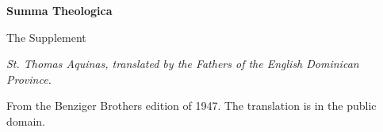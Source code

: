 \documentclass[11pt,letterpaper]{article}
\begin{document}
\color{ink}

\begin{titlepage}
\centering
\vspace*{4em}
{\LARGE\bfseries\color{heading} Summa Theologica\par}
\vspace{1.5em}
{\Large\color{subhead} The Supplement\par}
\vspace{2.5em}
{\itshape\color{subhead} St. Thomas Aquinas, translated by the Fathers of
the English Dominican Province.\par}
\vfill
{\small From the Benziger Brothers edition of 1947. The translation is in
the public domain.\par}
\vspace{2em}
\end{titlepage}

\tableofcontents


\end{document}
